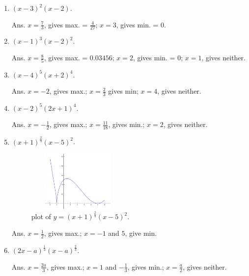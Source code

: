 \begin{enumerate}
\addtocounter{enumi}{68}
\item
$(x - 3)^2(x - 2)$. 	

Ans. 	$x = \frac{7}{3}$, gives max. = $\frac{4}{27}$;
$x = 3$, gives min. = $0$.

\item
$(x - 1)^3(x - 2)^2$. 

Ans. $x = \frac{8}{5}$, gives max. = $0.03456$;
$x = 2$, gives min. = $0$; $x = 1$, gives neither.

\item
$(x - 4)^5(x + 2)^4$. 	

Ans. $x = - 2$, gives max.;
$x = \frac{2}{3}$ gives min; $x = 4$, gives neither.

\item
$(x - 2)^5(2x + 1)^4$. 

Ans. $x = -\frac{1}{2}$, gives max.;
  $x = \frac{11}{18}$, gives min.;
  	$x = 2$, gives neither.

\item
$(x + 1)^{\frac{2}{3}}(x - 5)^2$.

\begin{figure}[h!]
\begin{minipage}{\textwidth}
\begin{center}
\includegraphics[height=3cm,width=5cm]{ch8-prblm73.eps}
\end{center}
\end{minipage}
\caption{\sage plot of $y=(x + 1)^{\frac{2}{3}}(x - 5)^2$.}
\label{fig:ch8-prblm73}
\end{figure}

Ans. $ 	x = \frac{1}{2}$, gives max.;
 $x = -1$ and $5$, give min.

\item
$(2x - a)^{\frac{1}{3}} (x - a)^{\frac{2}{3}}$. 

Ans. $	x = \frac{2a}{3}$, gives max.;
  	$x = 1$ and $-\frac{1}{3}$, gives min.;
  	$x = \frac{a}{2}$, gives neither.


\end{enumerate}
